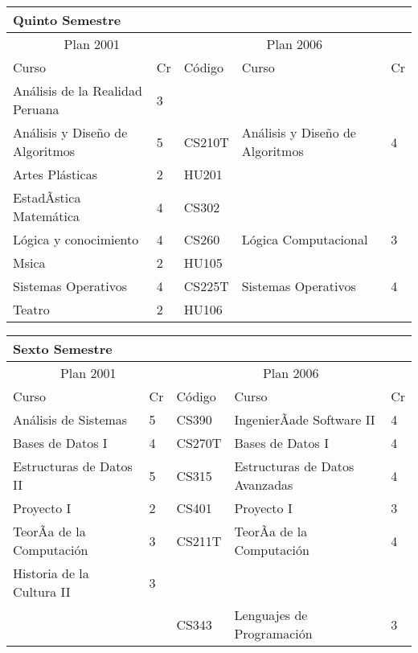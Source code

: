 \begin{center}
\begin{tabularx}{0.95\textwidth}{|p{4cm}|p{1cm}||p{2cm}|X|p{1cm}|}\hline
\multicolumn{5}{|l|}{\textbf{Quinto Semestre}} \\ \hline
\multicolumn{2}{|c|}{Plan 2001} & \multicolumn{3}{|c|}{Plan 2006} \\ \hline
Curso & Cr & Código & Curso & Cr \\ \hline
Análisis de la Realidad Peruana & 3 &  &  & \\ \hline
Análisis y Diseño de Algoritmos & 5 & CS210T & Análisis y Diseño de Algoritmos & 4 \\ \hline
Artes Plásticas & 2 & HU201 &  & \\ \hline
EstadÃ­stica Matemática & 4 & CS302 &  & \\ \hline
Lógica y conocimiento & 4 & CS260 & Lógica Computacional & 3 \\ \hline
Msica & 2 & HU105 &  & \\ \hline
Sistemas Operativos & 4 & CS225T & Sistemas Operativos & 4 \\ \hline
Teatro & 2 & HU106 &  & \\ \hline
\end{tabularx}
\end{center}

\begin{center}
\begin{tabularx}{0.95\textwidth}{|p{4cm}|p{1cm}||p{2cm}|X|p{1cm}|}\hline
\multicolumn{5}{|l|}{\textbf{Sexto Semestre}} \\ \hline
\multicolumn{2}{|c|}{Plan 2001} & \multicolumn{3}{|c|}{Plan 2006} \\ \hline
Curso & Cr & Código & Curso & Cr \\ \hline
Análisis de Sistemas & 5 & CS390 & IngenierÃ­ade Software II & 4 \\ \hline
Bases de Datos I & 4 & CS270T & Bases de Datos I & 4 \\ \hline
Estructuras de Datos II & 5 & CS315 & Estructuras de Datos Avanzadas & 4 \\ \hline
Proyecto I & 2 & CS401 & Proyecto I & 3 \\ \hline
TeorÃ­a de la Computación & 3 & CS211T & TeorÃ­a de la Computación & 4 \\ \hline
Historia de la Cultura II & 3 &  &  & \\ \hline
 &  & CS343 & Lenguajes de Programación & 3 \\ \hline
\end{tabularx}
\end{center}

